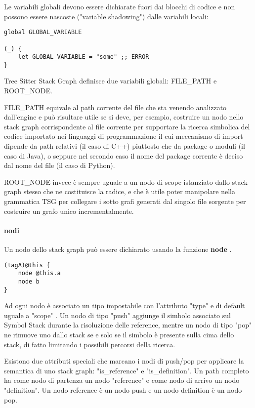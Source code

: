 Le variabili globali devono essere dichiarate fuori dai blocchi di codice e non possono essere nascoste ("variable shadowing") dalle variabili locali:

\begin{lstlisting}
global GLOBAL_VARIABLE

(_) {
    let GLOBAL_VARIABLE = "some" ;; ERROR
}
\end{lstlisting}

Tree Sitter Stack Graph definisce due variabili globali: FILE\_PATH e ROOT\_NODE.

FILE\_PATH equivale al path corrente del file che sta venendo analizzato dall'engine e pu\`o risultare utile se si deve, per esempio, costruire un nodo nello stack graph corrispondente al file corrente per supportare la ricerca simbolica del codice importato nei linguaggi di programmazione il cui meccanismo di import dipende da path relativi (il caso di C++) piuttosto che da package o moduli (il caso di Java), o seppure nel secondo caso il nome del package corrente \`e deciso dal nome del file (il caso di Python).

ROOT\_NODE invece \`e sempre uguale a un nodo di scope istanziato dallo stack graph stesso che ne costituisce la radice, e che \`e utile poter manipolare nella grammatica TSG per collegare i sotto grafi generati dal singolo file sorgente per costruire un grafo unico incrementalmente.

\paragraph{nodi}

Un nodo dello stack graph pu\`o essere dichiarato usando la funzione \textbf{node} \cite{TreeSitterGraphReferenceGraphNodes}.

\begin{lstlisting}
(tagA)@this {
    node @this.a
    node b
}
\end{lstlisting}

Ad ogni nodo \`e associato un tipo impostabile con l'attributo "type" e di default uguale a "scope" \cite{TreeSitterStackGraphNodes}.
Un nodo di tipo "push" aggiunge il simbolo associato sul Symbol Stack durante la risoluzione delle reference, mentre un nodo di tipo "pop" ne rimuove uno dallo stack se e solo se il simbolo \`e presente sulla cima dello stack, di fatto limitando i possibili percorsi della ricerca.

Esistono due attributi speciali che marcano i nodi di push/pop per applicare la semantica di uno stack graph: "is\_reference" e "is\_definition".
Un path completo ha come nodo di partenza un nodo "reference" e come nodo di arrivo un nodo "definition".
Un nodo reference \`e un nodo push e un nodo definition \`e un nodo pop.

